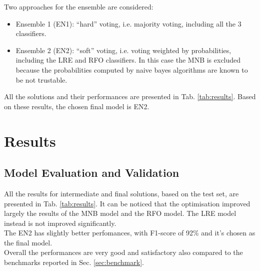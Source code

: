 \documentclass[a4paper,12pt]{article} %
\begin{document}
Two approaches for the ensemble are considered:
\begin{itemize}
\item Ensemble 1 (EN1): ``hard'' voting, i.e. majority voting, including all the 3 classifiers.
\item Ensemble 2 (EN2): ``soft'' voting, i.e. voting weighted by probabilities, including the LRE and RFO classifiers.
In this case the MNB is excluded because the probabilities computed by naive bayes
algorithms are known to be not trustable.
\end{itemize}

All the solutions and their performances are presented in Tab. \ref{tab:results}.
Based on these results, the chosen final model is EN2.


\section{Results}

\subsection{Model Evaluation and Validation}
All the results for intermediate and final solutions, based on the test set,
are presented in Tab. \ref{tab:results}.
It can be noticed that the optimisation improved largely the results
of the MNB model and the RFO model.
The LRE model instead is not improved significantly. \\
The EN2 has slightly better perfomances, with F1-score of 92\% and
it's chosen as the final model. \\
Overall the performances are very good and satisfactory also
compared to the benchmarks reported in Sec. \ref{sec:benchmark}.
\end{document}
